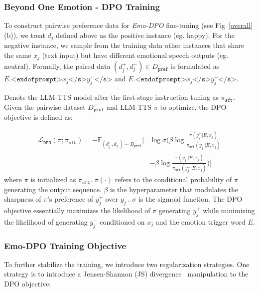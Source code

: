 \subsubsection{Beyond One Emotion - DPO Training} To construct pairwise preference data for \textit{Emo-DPO} fine-tuning (see Fig~\ref{overall} (b)), we treat $d_j$ defined above as the positive instance (eg. happy). For the negative instance, we sample from the training data other instances that share the same $x_j$ (text input) but have different emotional speech outputs (eg. neutral). Formally, the paired data $(d_j^+, d_j^-) \in D_\texttt{pref}$ is formulated as $E. \texttt{<endofprompt>} x_j \texttt{</s>} y_j^{+} \texttt{</s>}$ and $E. \texttt{<endofprompt>} x_j \texttt{</s>} y_j^{-} \texttt{</s>}$.

Denote the LLM-TTS model after the first-stage instruction tuning as $\pi_{\texttt{sft}}$. Given the pairwise dataset $D_\texttt{pref}$ and LLM-TTS $\pi$ to optimize, the DPO objective is defined as:

\begin{equation*}
\begin{aligned}
  \mathcal{L}_{\texttt{DPO}}(\pi; \pi_{\texttt{sft}}) = -\mathbb{E}_{(d_j^+, d_j^-) \sim D_\texttt{pref}} \Bigg[ 
  & \log \sigma \Big( \beta \log \frac{\pi(y^{+}_j | E, x_j)}{\pi_{\texttt{sft}}(y^{+}_j | E, x_j)} \\ 
  & - \beta \log \frac{\pi(y^{-}_j | E, x_j)}{\pi_{\texttt{sft}}(y^{-}_j | E, x_j)} \Big) \Bigg]
\end{aligned}
\end{equation*}
where $\pi$ is initialized as $\pi_{\texttt{sft}}$. $\pi(\cdot)$ refers to the conditional probability of $\pi$ generating the output sequence. $\beta$ is the hyperparameter that modulates the sharpness of $\pi$'s preference of $y_j^+$ over $y_j^-$. $\sigma$ is the sigmoid function. The DPO objective essentially maximizes the likelihood of $\pi$ generating $y_j^+$ while minimizing the likelihood of generating $y_j^-$ conditioned on $x_j$ and the emotion trigger word $E$. 

\subsubsection{Emo-DPO Training Objective} To further stabilize the training, we introduce two regularization strategies. 
One strategy is to introduce a Jensen-Shannon (JS) divergence~\cite{menendez1997jensen} manipulation to the DPO objective: 

